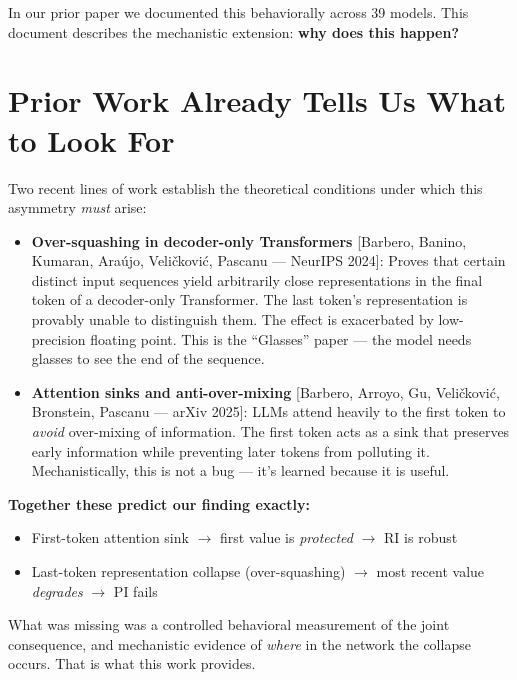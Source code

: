 \documentclass[9pt, a4paper]{article}
\begin{document}
In our prior paper we documented this behaviorally across 39 models. This document describes the mechanistic extension: \textbf{why does this happen?}

\section*{Prior Work Already Tells Us What to Look For}

Two recent lines of work establish the theoretical conditions under which this asymmetry \textit{must} arise:

\begin{itemize}
    \item \textbf{Over-squashing in decoder-only Transformers} [Barbero, Banino, Kumaran, Araújo, Veličković, Pascanu — NeurIPS 2024]: Proves that certain distinct input sequences yield arbitrarily close representations in the final token of a decoder-only Transformer. The last token's representation is provably unable to distinguish them. The effect is exacerbated by low-precision floating point. This is the ``Glasses'' paper — the model needs glasses to see the end of the sequence.

    \item \textbf{Attention sinks and anti-over-mixing} [Barbero, Arroyo, Gu, Veličković, Bronstein, Pascanu — arXiv 2025]: LLMs attend heavily to the first token to \textit{avoid} over-mixing of information. The first token acts as a sink that preserves early information while preventing later tokens from polluting it. Mechanistically, this is not a bug — it's learned because it is useful.
\end{itemize}

\textbf{Together these predict our finding exactly:}
\begin{itemize}
    \item First-token attention sink $\rightarrow$ first value is \textit{protected} $\rightarrow$ RI is robust
    \item Last-token representation collapse (over-squashing) $\rightarrow$ most recent value \textit{degrades} $\rightarrow$ PI fails
\end{itemize}

What was missing was a controlled behavioral measurement of the joint consequence, and mechanistic evidence of \textit{where} in the network the collapse occurs. That is what this work provides.
\end{document}
